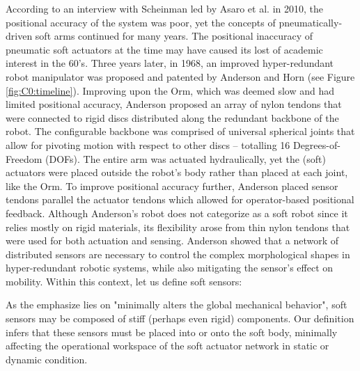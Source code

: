 According to an interview with Scheinman led by Asaro et al. \cite{ETHW2020Dec} in 2010, the positional accuracy of the system was poor, yet the concepts of pneumatically-driven soft arms continued for many years. The positional inaccuracy of pneumatic soft actuators at the time may have caused its lost of academic interest in the 60's. Three years later, in 1968, an improved hyper-redundant robot manipulator was proposed and patented by Anderson and Horn \cite{Anderson1968} (see Figure \ref{fig:C0:timeline}). Improving upon the Orm, which was deemed slow and had limited positional accuracy, Anderson proposed an array of nylon tendons that were connected to rigid discs distributed along the redundant backbone of the robot. The configurable backbone was comprised of universal spherical joints that allow for pivoting motion with respect to other discs -- totalling 16 Degrees-of-Freedom (DOFs). The entire arm was actuated hydraulically, yet the (soft) actuators were placed outside the robot's body rather than placed at each joint, like the Orm. To improve positional accuracy further, Anderson placed sensor tendons parallel the actuator tendons which allowed for operator-based positional feedback. Although Anderson's robot does not categorize as a soft robot since it relies mostly on rigid materials, its flexibility arose from thin nylon tendons that were used for both actuation and sensing. Anderson showed that a network of distributed sensors are necessary to control the complex morphological shapes in  hyper-redundant robotic systems, while also mitigating the sensor's effect on mobility. Within this context, let us define soft sensors:

%
\begin{rmk}
  \vspace{-1mm}
As the emphasize lies on "minimally alters the global mechanical behavior", soft sensors may be composed of stiff (perhaps even rigid) components. Our definition infers that these sensors must be placed into or onto the soft body, minimally affecting the operational workspace of the soft actuator network in static or dynamic condition.
\end{rmk}

